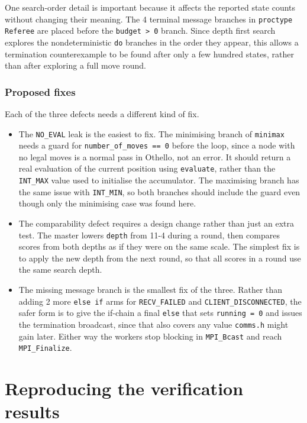 \documentclass[10pt,a4paper]{article}
\newcommand{\code}[1]{\texttt{#1}}
\begin{document}
One search-order detail is important because it affects the reported 
state counts without changing their meaning. The 4 terminal message branches 
in \code{proctype Referee} are placed before the \code{budget > 0} branch. 
Since depth first search explores the nondeterministic \code{do} branches in 
the order they appear, this allows a termination counterexample to be found 
after only a few hundred states, rather than after exploring a full move 
round.

\subsubsection*{Proposed fixes}

Each of the three defects needs a different kind of fix.

\begin{itemize}
  \item The \code{NO\_EVAL} leak is the easiest to fix. The minimising branch 
  of \code{minimax} needs a guard for \code{number\_of\_moves == 0} before the 
  loop, since a node with no legal moves is a normal pass in Othello, not an 
  error. It should return a real evaluation of the current position using 
  \code{evaluate}, rather than the \code{INT\_MAX} value used to initialise 
  the accumulator. The maximising branch has the same issue with 
  \code{INT\_MIN}, so both branches should include the guard even though only 
  the minimising case was found here.
  \item The comparability defect requires a design change rather than just an 
  extra test. The master lowers \code{depth} from 11-4 during a round, then 
  compares scores from both depths as if they were on the same scale. 
  The simplest fix is to apply the new depth from the next round, so that all 
  scores in a round use the same search depth. 
  \item The missing message branch is the smallest fix of the three. Rather
  than adding 2 more \code{else if} arms for \code{RECV\_FAILED} and
  \code{CLIENT\_DISCONNECTED}, the safer form is to give the if-chain a final
  \code{else} that sets \code{running = 0} and issues the termination
  broadcast, since that also covers any value \code{comms.h} might gain
  later. Either way the workers stop blocking in \code{MPI\_Bcast} and reach
  \code{MPI\_Finalize}.
\end{itemize}

\appendix
\section{Reproducing the verification results}
\end{document}
